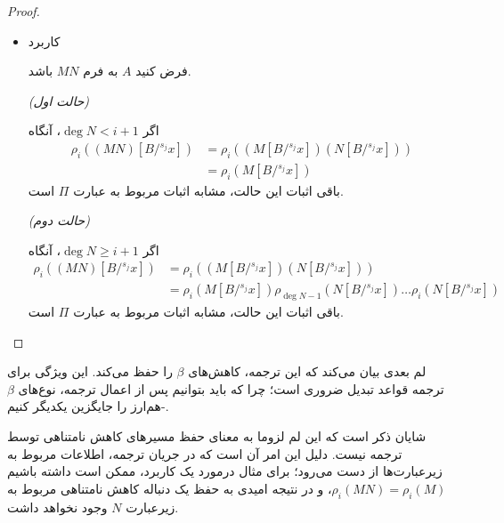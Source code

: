 \begin{proof}
\begin{itemize}
\textit{(حالت اول)}

اگر
$\operatorname{deg} C < i + 2$،
آنگاه
\begin{align*}
\rho_i((\lambda y^C.D)[B/{}^{s_j}x]) 
&= \rho_i(\lambda y^{C[B/{}^{s_j}x]}.D[B/{}^{s_j}x]) \\ 
&= \rho_i(D[B/{}^{s_j}x])
\end{align*}
باقی‌ اثبات این حالت، مشابه اثبات مربوط به عبارت $\Pi$ است.

\textit{(حالت دوم)}

اگر
$\operatorname{deg} C \ge i + 2$،
آنگاه
\begin{align*}
\rho_i&((\lambda y^C.D)[B/{}^{s_j}x]) \\
&= \rho_i(\lambda y^{C[B/{}^{s_j}x]}.D[B/{}^{s_j}x]) \\ 
&= \lambda y^{\rho_{\operatorname{deg} C-1}(C[B/{}^{s_j}x])} \dots \lambda y^{\rho_{i}(C[B/{}^{s_j}x])}.\rho_i(D[B/{}^{s_j}x])
\end{align*}
باقی‌ اثبات این حالت، مشابه اثبات مربوط به عبارت $\Pi$ است.

\item کاربرد

فرض کنید
$A$
به فرم
$MN$
باشد.

\textit{(حالت اول)}

اگر
$\operatorname{deg} N < i + 1$،
آنگاه
\begin{align*}
\rho_i((MN)[B/{}^{s_j}x]) 
&= \rho_i((M[B/{}^{s_j}x])(N[B/{}^{s_j}x])) \\ 
&= \rho_i(M[B/{}^{s_j}x])
\end{align*}
باقی‌ اثبات این حالت، مشابه اثبات مربوط به عبارت $\Pi$ است.

\textit{(حالت دوم)}

اگر
$\operatorname{deg} N \ge i + 1$،
آنگاه
\begin{align*}
\rho_i((MN)[B/{}^{s_j}x]) 
&= \rho_i((M[B/{}^{s_j}x])(N[B/{}^{s_j}x])) \\ 
&= \rho_i(M[B/{}^{s_j}x]) \rho_{\operatorname{deg} N - 1}(N[B/{}^{s_j}x]) \dots \rho_{i}(N[B/{}^{s_j}x])
\end{align*}
باقی‌ اثبات این حالت، مشابه اثبات مربوط به عبارت $\Pi$ است.
\end{itemize}
\end{proof}

لم بعدی بیان می‌کند که این ترجمه، کاهش‌های
$\beta$
را حفظ می‌کند. این ویژگی برای ترجمه قواعد تبدیل ضروری است؛ چرا که باید بتوانیم پس از اعمال ترجمه، نوع‌های
$\beta$-هم‌ارز
را جایگزین یکدیگر کنیم.

شایان ذکر است که این لم لزوما به معنای حفظ مسیرهای کاهش نامتناهی توسط ترجمه نیست.
دلیل این امر آن است که در جریان ترجمه، اطلاعات مربوط به زیرعبارت‌ها از دست می‌رود؛
برای مثال درمورد یک کاربرد، ممکن است داشته باشیم
$\rho_i(MN) = \rho_i(M)$،
و در نتیجه امیدی به حفظ یک دنباله کاهش نامتناهی مربوط به زیرعبارت
$N$
وجود نخواهد داشت.

